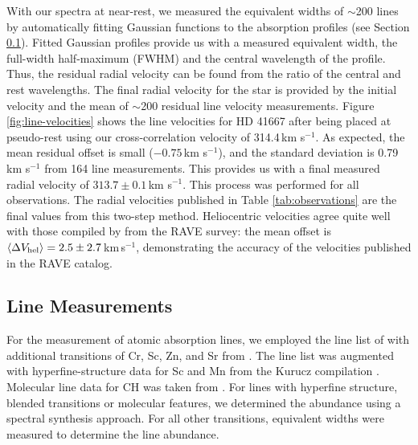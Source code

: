 \documentclass{emulateapj}
\begin{document}
With our spectra at near-rest, we measured the equivalent widths of $\sim$200 lines by automatically fitting Gaussian functions to the absorption profiles (see Section \ref{sec:line-measurements}). Fitted Gaussian profiles provide us with a measured equivalent width, the full-width half-maximum (FWHM) and the central wavelength of the profile. Thus, the residual radial velocity can be found from the ratio of the central and rest wavelengths. The final radial velocity for the star is provided by the initial velocity and the mean of $\sim$200 residual line velocity measurements. Figure \ref{fig:line-velocities} shows the line velocities for HD 41667 after being placed at pseudo-rest using our cross-correlation velocity of 314.4\,km s$^{-1}$. As expected, the mean residual offset is small ($-0.75$\,km s$^{-1}$), and the standard deviation is 0.79\,km s$^{-1}$ from 164 line measurements. This provides us with a final measured radial velocity of $313.7 \pm 0.1$\,km s$^{-1}$. This process was performed for all observations. The radial velocities published in Table \ref{tab:observations} are the final values from this two-step method. Heliocentric velocities agree quite well with those compiled by \citet{williams;et-al_2011} from the RAVE survey: the mean offset is $\langle\Delta{V_{\rm hel}}\rangle = 2.5 \pm 2.7$\,km\,s$^{-1}$, demonstrating the accuracy of the velocities published in the RAVE catalog.




\subsection{Line Measurements}
\label{sec:line-measurements}

For the measurement of atomic absorption lines, we employed the line list of \citet{yong;et-al_2005} with additional transitions of Cr, Sc, Zn, and Sr from \citet{frebel;et-al_2010}. The line list was augmented with hyperfine-structure data for Sc and Mn from the Kurucz compilation \citet{kurucz;1998}. Molecular line data for CH was taken from \citet{plez;et-al_2008,plez;et-al_2009}. For lines with hyperfine structure, blended transitions or molecular features, we determined the abundance using a spectral synthesis approach. For all other transitions, equivalent widths were measured to determine the line abundance.
\end{document}
